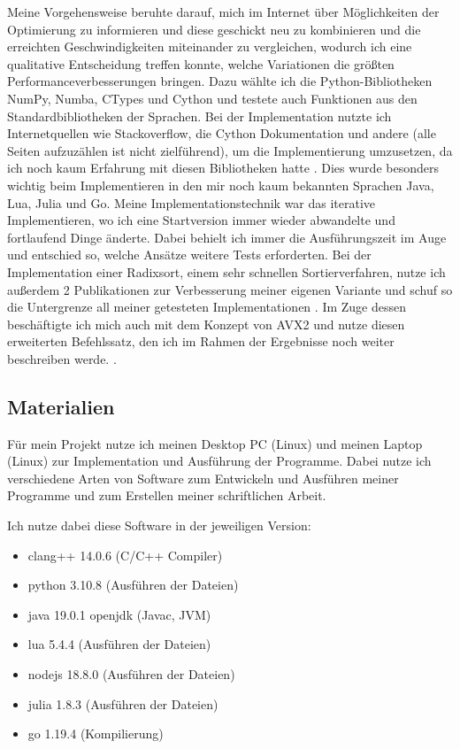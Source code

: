 \documentclass[10pt,a4paper]{article}
\begin{document}
Meine Vorgehensweise beruhte darauf, mich im Internet über Möglichkeiten der Optimierung zu informieren und diese geschickt neu zu kombinieren und die erreichten Geschwindigkeiten miteinander zu vergleichen, wodurch
ich eine qualitative Entscheidung treffen konnte, welche Variationen die größten Performanceverbesserungen bringen.
Dazu wählte ich die Python-Bibliotheken NumPy, Numba, CTypes und Cython und
testete auch Funktionen aus den Standardbibliotheken der Sprachen.
Bei der Implementation nutzte ich Internetquellen wie Stackoverflow, die Cython Dokumentation und andere 
(alle Seiten aufzuzählen ist nicht zielführend), um die Implementierung umzusetzen, 
da ich noch kaum Erfahrung mit diesen Bibliotheken hatte \cite{stackoverflow} \cite{cythondocs}.
Dies wurde besonders wichtig beim Implementieren in den mir noch kaum bekannten Sprachen Java, Lua, Julia und Go.
Meine Implementationstechnik war das iterative Implementieren, wo ich eine Startversion immer wieder abwandelte und
fortlaufend Dinge änderte. Dabei behielt ich immer die Ausführungszeit im Auge und entschied so, welche Ansätze
weitere Tests erforderten.
Bei der Implementation einer Radixsort, einem sehr schnellen Sortierverfahren, nutze ich außerdem 2 Publikationen 
zur Verbesserung meiner eigenen Variante und schuf so die Untergrenze all meiner getesteten Implementationen
\cite{terdiman} \cite{michael}.
Im Zuge dessen beschäftigte ich mich auch mit dem Konzept von AVX2 und nutze diesen erweiterten Befehlssatz, den
ich im Rahmen der Ergebnisse noch weiter beschreiben werde.
\cite{intelavxdocs} \cite{avxguide}.

\clearpage

\subsection{Materialien}
Für mein Projekt nutze ich meinen Desktop PC (Linux) und meinen Laptop (Linux) zur Implementation und Ausführung der Programme.
Dabei nutze ich verschiedene Arten von Software zum Entwickeln und Ausführen meiner Programme und zum Erstellen meiner
schriftlichen Arbeit. \newline

Ich nutze dabei diese Software in der jeweiligen Version:

\begin{itemize}
    \item clang++ 14.0.6 (C/C++ Compiler)
    \item python 3.10.8 (Ausführen der Dateien)
    \item java 19.0.1 openjdk (Javac, JVM)
    \item lua 5.4.4 (Ausführen der Dateien)
    \item nodejs 18.8.0 (Ausführen der Dateien)
    \item julia 1.8.3 (Ausführen der Dateien)
    \item go 1.19.4 (Kompilierung)
\end{itemize}
\end{document}
